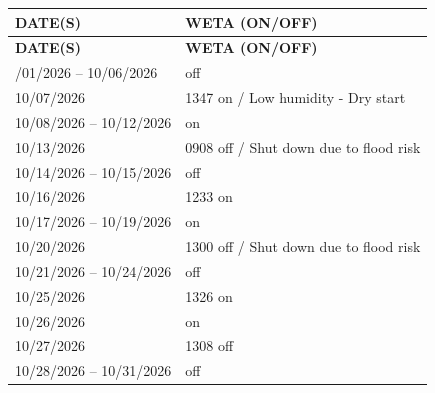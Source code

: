 \begin{longtable}{|p{5cm}|p{10cm}|}
\hline
\textbf{DATE(S)} & \textbf{WETA (ON/OFF)} \\
\hline
\endfirsthead
\hline
\textbf{DATE(S)} & \textbf{WETA (ON/OFF)} \\
\hline
\endhead
\hline
\endfoot
\hline
\endlastfoot
10/01/2026 -- 10/06/2026 & off \\
\hline
\rowcolor{greenhighlight}
10/07/2026 & 1347 on / Low humidity - Dry start \\
\hline
\rowcolor{greenhighlight}
10/08/2026 -- 10/12/2026 & on \\
\hline
10/13/2026 & 0908 off / Shut down due to flood risk \\
\hline
10/14/2026 -- 10/15/2026 & off \\
\hline
\rowcolor{greenhighlight}
10/16/2026 & 1233 on \\
\hline
\rowcolor{greenhighlight}
10/17/2026 -- 10/19/2026 & on \\
\hline
10/20/2026 & 1300 off / Shut down due to flood risk \\
\hline
10/21/2026 -- 10/24/2026 & off \\
\hline
\rowcolor{greenhighlight}
10/25/2026 & 1326 on \\
\hline
\rowcolor{greenhighlight}
10/26/2026 & on \\
\hline
10/27/2026 & 1308 off \\
\hline
10/28/2026 -- 10/31/2026 & off \\
\hline
\end{longtable}